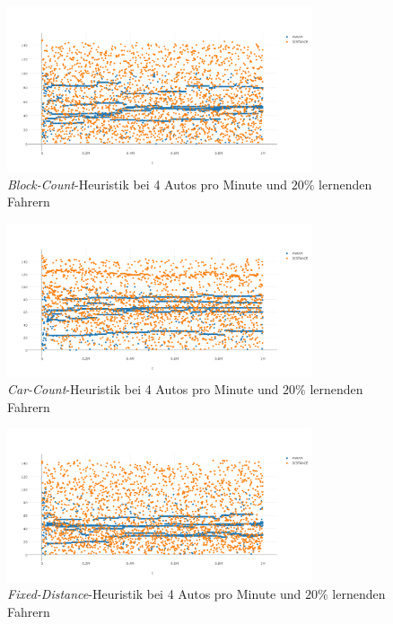 \begin{figure}[H]
	\includegraphics[width=0.8\textwidth]{analyse/SomeMutants/4pm/block4some.png}
	\caption{\emph{Block-Count}-Heuristik bei 4 Autos pro Minute und $20\%$ lernenden Fahrern}\label{fig:ap_pm_bs_4}
\end{figure}
\begin{figure}[H]
	\includegraphics[width=0.8\textwidth]{analyse/SomeMutants/4pm/car4some.png}
	\caption{\emph{Car-Count}-Heuristik bei 4 Autos pro Minute und $20\%$ lernenden Fahrern}\label{fig:ap_pm_cc_4}
\end{figure}
\begin{figure}[H]
	\includegraphics[width=0.8\textwidth]{analyse/SomeMutants/4pm/fixed4some.png}
	\caption{\emph{Fixed-Distance}-Heuristik bei 4 Autos pro Minute und $20\%$ lernenden Fahrern}\label{fig:ap_pm_fd_4}
\end{figure}
